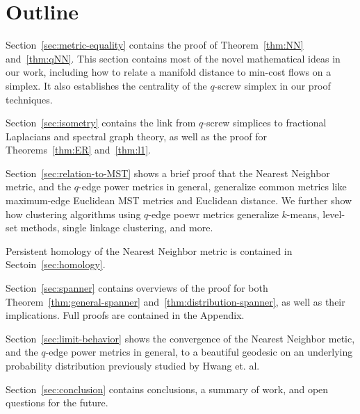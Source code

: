 \section{Outline}
%  
Section~\ref{sec:metric-equality} contains the proof of Theorem~\ref{thm:NN}
and~\ref{thm:qNN}. This section contains most of the novel mathematical
ideas in our work, including how to relate a manifold distance to min-cost
flows on a simplex. It also establishes the centrality of the $q$-screw
simplex in our proof techniques.

Section~\ref{sec:isometry} contains the link from $q$-screw simplices to
fractional Laplacians and spectral graph theory, as well as the proof for
Theorems~\ref{thm:ER} and~\ref{thm:l1}.

Section~\ref{sec:relation-to-MST} shows a brief proof that the Nearest Neighbor
metric, and the $q$-edge power metrics in general, generalize common
metrics like maximum-edge Euclidean MST metrics and Euclidean distance. We
further show how clustering algorithms using $q$-edge poewr metrics
generalize $k$-means, level-set methods, single linkage clustering, and
more.

Persistent homology of the Nearest Neighbor metric is contained in
Sectoin~\ref{sec:homology}.

Section~\ref{sec:spanner} contains overviews of the proof for both
Theorem~\ref{thm:general-spanner} and~\ref{thm:distribution-spanner}, as
well as their implications. Full
proofs are contained in the Appendix.

Section~\ref{sec:limit-behavior} shows the convergence of the Nearest Neighbor
metic, and the $q$-edge power metrics in general, to a beautiful geodesic
on an underlying probability distribution previously studied by Hwang et.
al.

Section~\ref{sec:conclusion} contains conclusions, a summary of work, and
open questions for the future.
